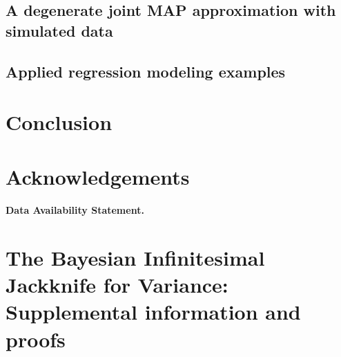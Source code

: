 \documentclass[12pt]{article} %
\begin{document}
\subsection{A degenerate joint MAP approximation with simulated data}


\subsection{Applied regression modeling examples}


\section{Conclusion}


 { 
    \section{Acknowledgements}
    
}



 {
    \paragraph{Data Availability Statement.}
    
    \printbibliography{}
}

\newpage




 {
    \section*{The Bayesian Infinitesimal Jackknife for Variance: Supplemental information and proofs}
    \appendix
}
\end{document}

